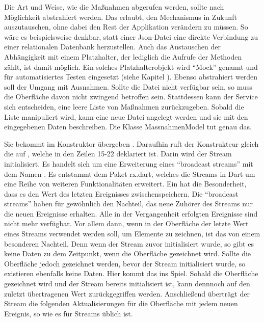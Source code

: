 Die Art und Weise, wie die Maßnahmen abgerufen werden, sollte nach Möglichkeit abstrahiert werden. Das erlaubt, den Mechanismus in Zukunft auszutauschen, ohne dabei den Rest der Applikation verändern zu müssen. So wäre es beispielsweise denkbar, statt einer Json-Datei eine direkte Verbindung zu einer relationalen Datenbank herzustellen. Auch das Austauschen der Abhängigkeit mit einem Platzhalter, der lediglich die Aufrufe der Methoden zählt, ist damit möglich. Ein solches Platzhalterobjekt wird \enquote{Mock} genannt und für automatisiertes Testen eingesetzt (siehe Kapitel  ). Ebenso abstrahiert werden soll der Umgang mit Ausnahmen. Sollte die Datei nicht verfügbar sein, so muss die Oberfläche davon nicht zwingend betroffen sein. Stattdessen kann der Service sich entscheiden, eine leere Liste von Maßnahmen zurückzugeben. Sobald die Liste manipuliert wird, kann eine neue Datei angelegt werden und sie mit den eingegebenen Daten beschreiben. Die Klasse MassnahmenModel \Lst{\ref{lst:Schritt1KlasseMassnahmenModel}} tut genau das.






Sie bekommt  im Konstruktor übergeben . Daraufhin ruft der Konstrukteur gleich die  auf , welche in den Zeilen 15-22 deklariert ist. Darin wird der Stream   initialisiert. Es handelt sich um eine Erweiterung eines \enquote{broadcast streams} mit dem Namen  . Es entstammt dem Paket rx.dart, welches die Streams in Dart um eine Reihe von weiteren Funktionalitäten erweitert. Ein  hat die Besonderheit, dass es den Wert des letzten Ereignisses zwischenspeichern. Die \enquote{broadcast streams} haben für gewöhnlich den Nachteil, das neue Zuhörer des Streams nur die neuen Ereignisse erhalten. Alle in der Vergangenheit erfolgten Ereignisse sind nicht mehr verfügbar. Vor allem dann, wenn in der Oberfläche der letzte Wert eines Streams verwendet werden soll, um Elemente zu zeichnen, ist das von einem besonderen Nachteil. Denn wenn der Stream zuvor initialisiert wurde, so gibt es keine Daten zu dem Zeitpunkt, wenn die Oberfläche gezeichnet wird. Sollte die Oberfläche jedoch gezeichnet werden, bevor der Stream initialisiert wurde, so  existieren ebenfalls keine Daten. Hier kommt das  ins Spiel. Sobald die Oberfläche gezeichnet wird und der Stream bereits initialisiert ist, kann dennnoch auf den zuletzt übertragenen Wert zurückgegriffen werden. Anschließend überträgt der Stream die folgenden Aktualisierungen für die Oberfläche mit jedem neuen Ereignis, so wie es für Streams üblich ist.


